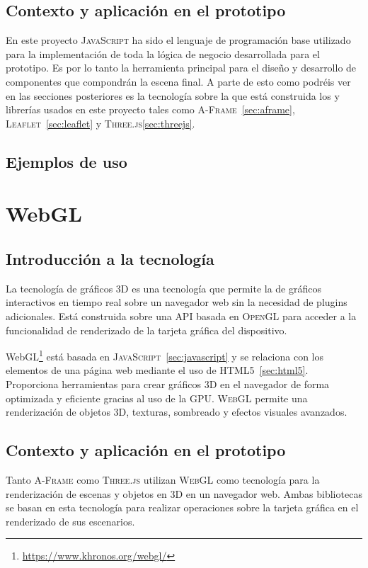 \documentclass[a4paper, 11pt]{book}
\begin{document}
\subsection{Contexto y aplicación en el prototipo}
En este proyecto \textsc{JavaScript} ha sido el lenguaje de programación base utilizado para la implementación de toda la lógica de negocio desarrollada para el prototipo. Es por lo tanto la herramienta principal para el diseño y desarrollo de componentes que compondrán la escena final. A parte de esto como podréis ver en las secciones posteriores es la tecnología sobre la que está construida los \emph{} y librerías usados en este proyecto tales como \textsc{A-Frame}~\ref{sec:aframe}, \textsc{Leaflet}~\ref{sec:leaflet} y \textsc{Three.js}\ref{sec:threejs}.
\subsection{Ejemplos de uso}

\section{WebGL}
\label{sec:webgl}
\subsection{Introducción a la tecnología}
La tecnología de gráficos \textsc{\gls{3D}} es una tecnología que permite la  de gráficos interactivos en tiempo real sobre un navegador web sin la necesidad de plugins adicionales. Está construida sobre una \textsc{\gls{API}} basada en \textsc{\gls{OpenGL}} para acceder a la funcionalidad de renderizado de la tarjeta gráfica del dispositivo.

WebGL\footnote{\url{https://www.khronos.org/webgl/}} está basada en \textsc{JavaScript}~\ref{sec:javascript} y se relaciona con los elementos de una página web mediante el uso de \textsc{HTML5}~\ref{sec:html5}. 
Proporciona herramientas para crear gráficos \textsc{3D} en el navegador de forma optimizada y eficiente gracias al uso de la \gls{GPU}. \textsc{WebGL} permite una renderización de objetos 3D, texturas, sombreado y efectos visuales avanzados.
\subsection{Contexto y aplicación en el prototipo}
Tanto \textsc{A-Frame} como \textsc{Three.js} utilizan \textsc{WebGL} como tecnología para la renderización de escenas y objetos en \textsc{3D} en un navegador web. Ambas bibliotecas se basan en esta tecnología para realizar operaciones sobre la tarjeta gráfica en el renderizado de sus escenarios.
\end{document}
